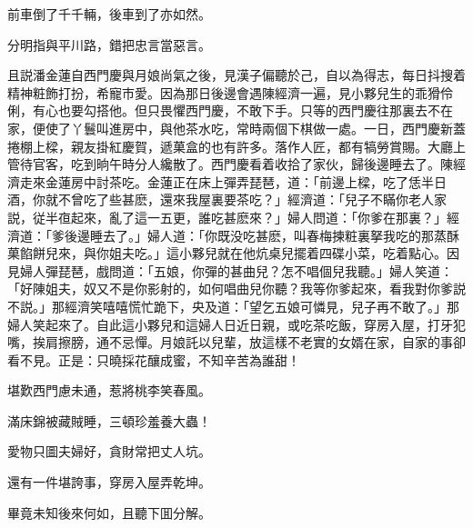 \begin{myquote}
前車倒了千千輛，後車到了亦如然。

分明指與平川路，錯把忠言當惡言。
\end{myquote}

且説潘金蓮自西門慶與月娘尚氣之後，見漢子偏聽於己，自以為得志，每日抖搜着精神粧飾打扮，希寵巿愛。因為那日後邊會遇陳經濟一遍，見小夥兒生的乖猾伶俐，有心也要勾搭他。但只畏懼西門慶，不敢下手。只等的西門慶往那裏去不在家，便使了丫鬟叫進房中，與他茶水吃，常時兩個下棋做一處。一日，西門慶新蓋捲棚上樑，親友掛紅慶賀，遞菓盒的也有許多。落作人匠，都有犒勞賞賜。大廳上管待官客，吃到晌午時分人纔散了。西門慶看着收拾了家伙，歸後邊睡去了。陳經濟走來金蓮房中討茶吃。金蓮正在床上彈弄琵琶，道：「前邊上樑，吃了恁半日酒，你就不曾吃了些甚麽，還來我屋裏要茶吃？」經濟道：「兒子不瞞你老人家説，従半亱起來，亂了這一五更，誰吃甚麽來？」婦人問道：「你爹在那裏？」經濟道：「爹後邊睡去了。」婦人道：「你既没吃甚麽，叫春梅揀粧裏拏我吃的那蒸酥菓餡餅兒來，與你姐夫吃。」這小夥兒就在他炕桌兒擺着四碟小菜，吃着點心。因見婦人彈琵琶，戲問道：「五娘，你彈的甚曲兒？怎不唱個兒我聽。」婦人笑道：「好陳姐夫，奴又不是你影射的，如何唱曲兒你聽？我等你爹起來，看我對你爹説不説。」那經濟笑嘻嘻慌忙跪下，央及道：「望乞五娘可憐見，兒子再不敢了。」那婦人笑起來了。自此這小夥兒和這婦人日近日親，或吃茶吃飯，穿房入屋，打牙犯嘴，挨肩擦膀，通不忌憚。月娘託以兒輩，放這樣不老實的女婿在家，自家的事卻看不見。正是：只曉採花釀成蜜，不知辛苦為誰甜！

\begin{myquote}
堪歎西門慮未通，惹將桃李笑春風。

滿床錦被藏賊睡，三頓珍羞養大蟲！

愛物只圖夫婦好，貪財常把丈人坑。

還有一件堪誇事，穿房入屋弄乾坤。
\end{myquote}

畢竟未知後來何如，且聽下囬分解。


